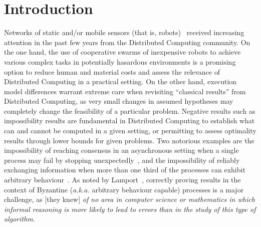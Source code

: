 \documentclass[11pt,a4]{llncs}
\newcommand{\x}{\xspace}
\newcommand{\coq}{\textsc{Coq}\x}
\begin{document}
\maketitle

\begin{abstract}
  We propose a framework to build formal developments for robot
  networks using the \coq proof assistant, to state and to prove
  formally various properties. We focus in this paper on
  \emph{impossibility} proofs, as it is natural to take advantage of
  the \coq higher order calculus to reason about algorithms as
  abstract objects. We present in particular formal proofs of two impossibility results for convergence of
  oblivious mobile robots if respectively more than one half and more
  than one third of the robots exhibit Byzantine failures, starting
  from the original theorems by Bouzid \emph{et al.}. Thanks to our formalization, the
  corresponding \coq developments are quite compact. To our knowledge,
  these are the first certified (in the sense of formally proved)
  impossibility results for robot networks.

\end{abstract}

\newpage

\section{Introduction}
\label{sec:introduction}



Networks of static and/or mobile sensors (that is, robots)~\cite{FPS12b} received
increasing attention in the past few years from the Distributed
Computing community. On the one hand, the use of cooperative swarms of
inexpensive robots to achieve various complex tasks in potentially
hasardous environments is a promising option to reduce
human and material costs and assess the relevance of Distributed
Computing in a practical setting. On the other hand, execution model
differences warrant extreme care when revisiting ``classical results''
from Distributed Computing, as very small changes in assumed
hypotheses may completely change the feasibility of a particular problem.
Negative results such as impossibility results are fundamental in
Distributed Computing to establish what can and cannot be computed in
a given setting, or permitting to assess optimality results through
lower bounds for given problems. Two notorious examples are the
impossibility of reaching consensus in an asynchronous setting when a
single process may fail by stopping unexpectedly~\cite{FLP85j}, and the
impossibility of reliably exchanging information when more than one
third of the processes can exhibit arbitrary
behaviour~\cite{PSL80j}. As noted by Lamport~\cite{lamport82jacm}, correctly proving
results in the context of Byzantine (\emph{a.k.a.} arbitrary behaviour
capable) processes is a major challenge, as [they knew] \emph{of no
area in computer science or mathematics in which informal reasoning is more
likely to lead to errors than in the study of this type of
algorithm}.
\end{document}
